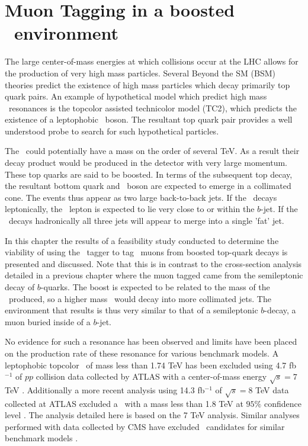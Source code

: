 \chapter{Muon Tagging in a boosted \ttbar\ environment} \label{sec:boosted_study}

The large center-of-mass energies at which collisions occur at the LHC allows for the production of very high mass particles. Several Beyond the SM (BSM) theories predict the existence of high mass particles which decay primarily top quark pairs.
An example of hypothetical model which predict high mass \ttbar\ resonances is the topcolor assisted technicolor model (TC2), which predicts the existence of a leptophobic \Zprime\ boson. The resultant top quark pair provides a well understood probe to search for such hypothetical particles. 

The \Zprime\ could potentially have a mass on the order of several TeV. As a result their decay product would be produced in the detector with very large momentum. These top quarks are said to be boosted. In terms of the subsequent top decay, the resultant bottom quark and \W\ boson are expected to emerge in a collimated cone. The events thus appear as two large back-to-back jets. If the \W\ decays leptonically, the \W\ lepton is expected to lie very close to or within the $b$-jet. If the \W\ decays hadronically all three jets will appear to merge into a single 'fat' jet.

In this chapter the results of a feasibility study conducted to determine the viability of using the \xsm\ tagger to tag \W\ muons from boosted top-quark decays is presented and discussed. Note that this is in contrast to the cross-section analysis detailed in a previous chapter where the muon tagged came from the semileptonic decay of $b$-quarks. The boost is expected to be related to the mass of the \Zprime\ produced, so a higher mass \Zprime\ would decay into more collimated jets. The environment that results is thus very similar to that of a semileptonic $b$-decay, a muon buried inside of a $b$-jet.

No evidence for such a resonance has been observed and limits have been placed on the production rate of these resonance for various benchmark models. A leptophobic topcolor \Zprime\ of mass less than 1.74 TeV has been excluded using 4.7 fb$^{-1}$ of $pp$ collision data collected by ATLAS with a center-of-mass energy $\sqrt{s}=7$ TeV \cite{Boosted:ATLASExclusion7TeV}. Additionally a more recent analysis using 14.3 fb$^{-1}$ of $\sqrt{s}=8$ TeV data collected at ATLAS excluded a \Zprime\ with a mass less than 1.8 TeV at $95\%$ confidence level \cite{Boosted:ATLASExclusion8TeV}.  The analysis detailed here is based on the 7 TeV analysis. Similar analyses performed with data collected by CMS have excluded \Zprime\ candidates for similar benchmark models \cite{Boosted:CMSSearch7TeVDilepton,Boosted:CMSSearchAnomalous,Boosted:CMSSearch8TeV}. 

